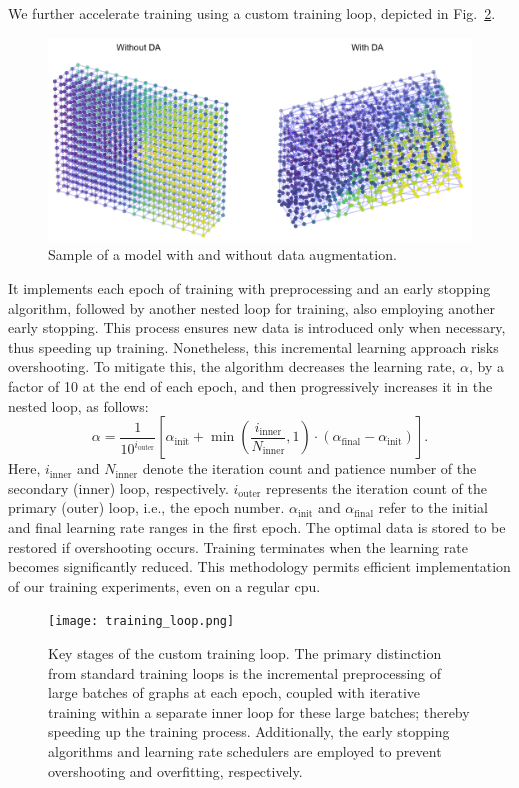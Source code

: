 We further accelerate training using a custom training loop, depicted in Fig.~\ref{fig:training_loop}.
%
\begin{figure}\centering
\includegraphics[width=0.8\linewidth,keepaspectratio]{da_sample.jpg}
\caption{Sample of a model with and without data augmentation.}\label{fig:da_sample}
\end{figure}
%
It implements each epoch of training with preprocessing and an early stopping algorithm, followed by another nested loop for training, also employing another early stopping. This process ensures new data is introduced only when necessary, thus speeding up training. Nonetheless, this incremental learning approach risks overshooting. To mitigate this, the algorithm decreases the learning rate, \( \alpha \), by a factor of 10 at the end of each epoch, and then progressively increases it in the nested loop, as follows:
%
\begin{equation}
    \alpha = \frac{1}{10^{i_{\text{outer}}}} \left[
    \alpha_{\text{init}} + \min\left(\frac{i_{\text{inner}}}{N_{\text{inner}}}, 1\right) \cdot (\alpha_{\text{final}} - \alpha_{\text{init}})
    \right].
\end{equation}
%
Here, \( i_{\text{inner}} \) and \( N_{\text{inner}} \) denote the iteration count and patience number of the secondary (inner) loop, respectively. \( i_{\text{outer}} \) represents the iteration count of the primary (outer) loop, i.e., the epoch number. \( \alpha_{\text{init}} \) and \( \alpha_{\text{final}} \) refer to the initial and final learning rate ranges in the first epoch. The optimal data is stored to be restored if overshooting occurs. Training terminates when the learning rate becomes significantly reduced. This methodology permits efficient implementation of our training experiments, even on a regular \ac{cpu}.
%
\begin{figure}\centering
\texttt{[image: training\_loop.png]}
\caption{Key stages of the custom training loop. The primary distinction from standard training loops is the incremental preprocessing of large batches of graphs at each epoch, coupled with iterative training within a separate inner loop for these large batches; thereby speeding up the training process. Additionally, the early stopping algorithms and learning rate schedulers are employed to prevent overshooting and overfitting, respectively.}\label{fig:training_loop}
\end{figure}

